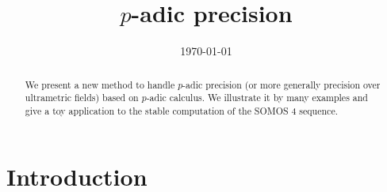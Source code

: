 \documentclass{lms}
\begin{document}
\newtheorem{theo}{Theorem}[section]
\newtheorem{lem}[theo]{Lemma}
\newtheorem{prop}[theo]{Proposition}
\newtheorem{cor}[theo]{Corollary}
\newtheorem{quest}[theo]{Question}
\newtheorem{rem}[theo]{Remark}
\newtheorem{ex}[theo]{Example}
\newtheorem{deftn}[theo]{Definition}
\newtheorem{rmk}[theo]{Remark}

\newcommand{\Z}{\mathbb Z}
\newcommand{\Zp}{\Z_p}
\newcommand{\Q}{\mathbb Q}
\newcommand{\Qp}{\Q_p}
\newcommand{\Fp}{\mathbb{F}_p}
\newcommand{\R}{\mathbb R}
\renewcommand{\O}{\mathcal O}
\newcommand{\OK}{\mathcal{O}_K}
\newcommand{\XX}{\mathbf X}
\newcommand{\trans}{{}^{\text t}}

\newcommand{\GL}{\text{\rm GL}}

\newcommand{\val}{\text{\rm val}}
\newcommand{\pr}{\text{\rm pr}}
\newcommand{\tr}{\text{\rm Tr}}
\newcommand{\com}{\text{\rm Com}}
\newcommand{\Grass}{\text{\rm Grass}}
\renewcommand{\prec}{\text{\rm prec}}

\newcommand{\lb}{\ensuremath{\llbracket}}
\newcommand{\rb}{\ensuremath{\rrbracket}}
\newcommand{\lp}{(\!(}
\newcommand{\rp}{)\!)}

\def\todo#1{\ \!\!{\color{red} #1}}
\def\todofor#1#2{\ \!\!{\color{purple} {\bf #1}: #2}}

\title{$p$-adic precision}
\date\today

\maketitle
\begin{abstract}
We present a new method to handle $p$-adic precision (or more generally
precision over ultrametric fields) based on $p$-adic calculus.
We illustrate it by many examples and give a toy application to the
stable computation of the SOMOS 4 sequence.
\end{abstract}

\setcounter{tocdepth}{1}
\tableofcontents

\section{Introduction}
\end{document}
